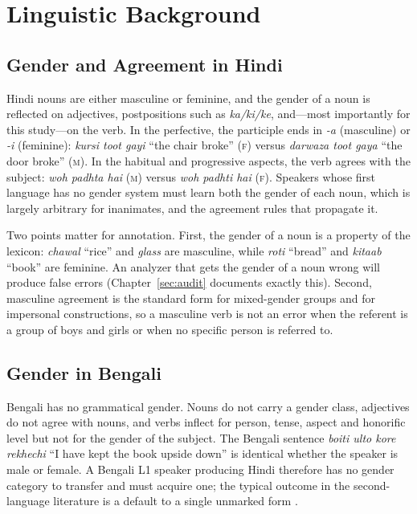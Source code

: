 \documentclass[11pt,a4paper]{report}
\begin{document}
\chapter{Linguistic Background}
\label{sec:background}

\section{Gender and Agreement in Hindi}

Hindi nouns are either masculine or feminine, and the gender of a noun is reflected on adjectives, postpositions such as \textit{ka/ki/ke}, and---most importantly for this study---on the verb. In the perfective, the participle ends in \textit{-a} (masculine) or \textit{-i} (feminine): \textit{kursi toot gayi} ``the chair broke'' (\textsc{f}) versus \textit{darwaza toot gaya} ``the door broke'' (\textsc{m}). In the habitual and progressive aspects, the verb agrees with the subject: \textit{woh padhta hai} (\textsc{m}) versus \textit{woh padhti hai} (\textsc{f}). Speakers whose first language has no gender system must learn both the gender of each noun, which is largely arbitrary for inanimates, and the agreement rules that propagate it.

Two points matter for annotation. First, the gender of a noun is a property of the lexicon: \textit{chawal} ``rice'' and \textit{glass} are masculine, while \textit{roti} ``bread'' and \textit{kitaab} ``book'' are feminine. An analyzer that gets the gender of a noun wrong will produce false errors (Chapter~\ref{sec:audit} documents exactly this). Second, masculine agreement is the standard form for mixed-gender groups and for impersonal constructions, so a masculine verb is not an error when the referent is a group of boys and girls or when no specific person is referred to.

\section{Gender in Bengali}

Bengali has no grammatical gender. Nouns do not carry a gender class, adjectives do not agree with nouns, and verbs inflect for person, tense, aspect and honorific level but not for the gender of the subject. The Bengali sentence \textit{boiti ulto kore rekhechi} ``I have kept the book upside down'' is identical whether the speaker is male or female. A Bengali L1 speaker producing Hindi therefore has no gender category to transfer and must acquire one; the typical outcome in the second-language literature is a default to a single unmarked form \citep{sabourin2006transfer, gruter2008article}.
\end{document}
